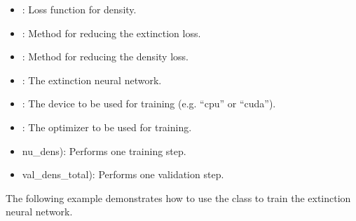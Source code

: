 \documentclass[letterpaper,10pt,english]{sphinxmanual}
\begin{document}
\begin{fulllineitems}
\begin{description}
\begin{itemize}
\item {} 
\sphinxAtStartPar
{}: Loss function for density.

\item {} 
\sphinxAtStartPar
{}: Method for reducing the extinction loss.

\item {} 
\sphinxAtStartPar
{}: Method for reducing the density loss.

\item {} 
\sphinxAtStartPar
{}: The extinction neural network.

\item {} 
\sphinxAtStartPar
{}: The device to be used for training (e.g. “cpu” or “cuda”).

\item {} 
\sphinxAtStartPar
{}: The optimizer to be used for training.

\end{itemize}

\begin{itemize}
\item {} \begin{description}
\sphinxAtStartPar
nu\_dens)\textasciigrave{}: Performs one training step.

\end{description}

\item {} \begin{description}
\sphinxAtStartPar
val\_dens\_total)\textasciigrave{}: Performs one validation step.

\end{description}

\end{itemize}

\sphinxAtStartPar
The following example demonstrates how to use the  class to train the extinction neural network.


\end{description}
\end{fulllineitems}
\end{document}
